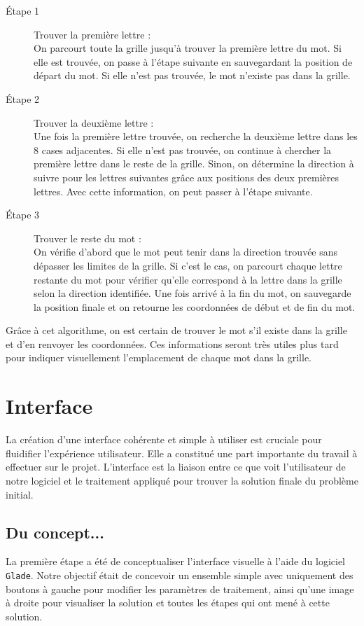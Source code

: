 \documentclass{article}
\begin{document}
\begin{description}
    \item[Étape 1] Trouver la première lettre :\\
    On parcourt toute la grille jusqu'à trouver la première lettre du mot. Si elle est trouvée, on passe à l'étape suivante en sauvegardant la position de départ du mot. Si elle n'est pas trouvée, le mot n'existe pas dans la grille.\\
    
    \item[Étape 2] Trouver la deuxième lettre :\\
    Une fois la première lettre trouvée, on recherche la deuxième lettre dans les 8 cases adjacentes. Si elle n'est pas trouvée, on continue à chercher la première lettre dans le reste de la grille. Sinon, on détermine la direction à suivre pour les lettres suivantes grâce aux positions des deux premières lettres. Avec cette information, on peut passer à l'étape suivante.\\
    
    \item[Étape 3] Trouver le reste du mot :\\
    On vérifie d'abord que le mot peut tenir dans la direction trouvée sans dépasser les limites de la grille. Si c'est le cas, on parcourt chaque lettre restante du mot pour vérifier qu'elle correspond à la lettre dans la grille selon la direction identifiée. Une fois arrivé à la fin du mot, on sauvegarde la position finale et on retourne les coordonnées de début et de fin du mot.\\
\end{description}
Grâce à cet algorithme, on est certain de trouver le mot s'il existe dans la grille et d'en renvoyer les coordonnées. Ces informations seront très utiles plus tard pour indiquer visuellement l'emplacement de chaque mot dans la grille.
\clearpage
\section{Interface}
La création d'une interface cohérente et simple à utiliser est cruciale pour fluidifier l'expérience utilisateur. Elle a constitué une part importante du travail à effectuer sur le projet. L'interface est la liaison entre ce que voit l'utilisateur de notre logiciel et le traitement appliqué pour trouver la solution finale du problème initial.\\

\subsection{Du concept...}
La première étape a été de conceptualiser l'interface visuelle à l'aide du logiciel \texttt{Glade}. Notre objectif était de concevoir un ensemble simple avec uniquement des boutons à gauche pour modifier les paramètres de traitement, ainsi qu'une image à droite pour visualiser la solution et toutes les étapes qui ont mené à cette solution.\\
\end{document}
